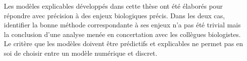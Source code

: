 \documentclass[../main.tex]{subfiles}
\begin{document}




Les modèles explicables développés dans cette thèse ont été élaborés pour répondre avec précision à des enjeux biologiques précis. Dans les deux cas, identifier la bonne méthode correspondante à ses enjeux n'a pas été trivial mais la conclusion d'une analyse menée en concertation avec les collègues biologistes.
Le critère que les modèles doivent être prédictifs et explicables ne permet pas en soi de choisir entre un modèle numérique et discret.

\end{document}
